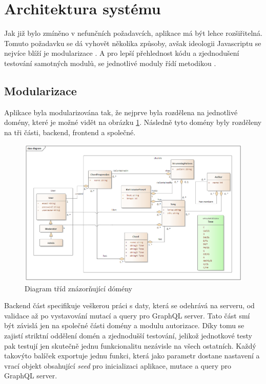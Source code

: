 \section{Architektura systému}
\label{sc:system_architecture}
Jak již bylo zmíněno v nefunčních požadavcích, aplikace má být lehce rozšiřitelná. Tomuto požadavku se dá vyhovět několika způsoby, avšak ideologii Javascriptu se nejvíce blíží je modularizace \cite{bevacqua_2018_mastering}. A pro lepší přehlednost kódu a zjednodušení testování samotných modulů, se jednotlivé moduly řídí metodikou .

\subsection{Modularizace}
Aplikace byla modularizována tak, že nejprve byla rozdělena na jednotlivé domény, které je možné vidět na obrázku \ref{fig:class_diagram}. Následně tyto domény byly rozděleny na tři části, backend, frontend a společné.

\begin{figure}
    \centering
    \includegraphics[width=\textwidth]{assets/class_diagram.png}
    \caption{Diagram tříd znázorňující dómény}
    \label{fig:class_diagram}
\end{figure}

Backend část specifikuje veškerou práci s daty, která se odehrává na serveru, od validace až po vystavování mutací a query pro GraphQL server. Tato část smí být závislá jen na společné části domény a modulu autorizace. Díky tomu se zajistí striktní oddělení domén a zjednodušší testování, jelikož jednotkové testy pak testují jen skutečně jednu funkcionalitu nezávisle na všech ostatních. Každý takovýto balíček exportuje jednu funkci, která jako parametr dostane nastavení a vrací objekt obsahující \emph{seed} pro inicializaci aplikace, mutace a query pro GraphQL server.

